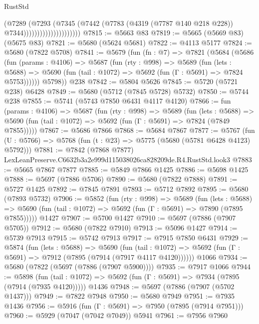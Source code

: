 \begin{lexlean}{RustStd}
\begin{coremodule}
                                    (@7289
                                      (@7293
                                        (@7345
                                          (@7442
                                            (@7783
                                              (@4319 (@7787 @140 @218 @228))
                                              @7344)))))))))))))))))))))
@7815 := @5663 @83
@7819 := @5665 (@5669 @83) (@5675 @83)
@7821 := @5680 (@5624 @5681)
@7822 := @4113 @5177
@7824 := @5680 (@7822 @5708)
@7841 := @5679
    (fun (fn : @7) =>
    @7821
      (@5684
        (@5686
          (fun (params : @4106) =>
          @5687
            (fun (rty : @998) =>
            @5689
              (fun (lets : @5688) =>
              @5690 (fun (tail : @1072) => @5692 (fun (Γ : @5691) => @7824 @5753))))))
        @5798))
    @238
@7842 := @5804 @5626
@7845 := @5720 (@5721 @238) @6428
@7849 := @5680 (@5712 (@7845 @5728) @5732)
@7850 := @5744 @238
@7855 := @5741 (@5743 @7850 @6431 @4117 @4120)
@7866 := fun (params : @4106) =>
  @5687
    (fun (rty : @998) =>
    @5689
      (fun (lets : @5688) =>
      @5690 (fun (tail : @1072) => @5692 (fun (Γ : @5691) => @7824 (@7849 @7855)))))
@7867 := @5686 @7866
@7868 := @5684 @7867
@7877 := @5767 (fun (U : @5766) => @5768 (fun (t : @23) => @5775 (@5680 (@5781 @6428 @4123) @5792)))
@7881 := @7842 (@7868 @7877) LexLeanPreserve.C6632b3a2e999d115038026ca828209de.R4.RustStd.look3
@7883 := @5665 @7867 @7877
@7885 := @5849 @7866 @1425
@7886 := @5698 @1425
@7888 := @5697 (@7886 @5706)
@7890 := @5680 (@7822 @7888)
@7891 := @5727 @1425
@7892 := @7845 @7891
@7893 := @5712 @7892
@7895 := @5680 (@7893 @5732)
@7906 := @5852
    (fun (rty : @998) =>
    @5689
      (fun (lets : @5688) =>
      @5690 (fun (tail : @1072) => @5692 (fun (Γ : @5691) => @7890 (@7895 @7855)))))
    @1427
@7907 := @5700 @1427
@7910 := @5697 (@7886 (@7907 @5705))
@7912 := @5680 (@7822 @7910)
@7913 := @5096 @1427
@7914 := @5739 @7913
@7915 := @5742 @7913
@7917 := @7915 @7850 @6431
@7929 := @5874
    (fun (lets : @5688) =>
    @5690
      (fun (tail : @1072) => @5692 (fun (Γ : @5691) => @7912 (@7895 (@7914 (@7917 @4117 @4120))))))
    @1066
@7934 := @5680 (@7822 (@5697 (@7886 (@7907 @5900))))
@7935 := @7917 @1066
@7944 := @5898
    (fun (tail : @1072) => @5692 (fun (Γ : @5691) => @7934 (@7895 (@7914 (@7935 @4120)))))
    @1436
@7948 := @5697 (@7886 (@7907 (@5702 @1437)))
@7949 := @7822 @7948
@7950 := @5680 @7949
@7951 := @7935 @1436
@7956 := @5916 (fun (Γ : @5691) => @7950 (@7895 (@7914 @7951)))
@7960 := @5929 (@7047 (@7042 @7049)) @5941
@7961 := @7956 @7960

\end{coremodule}
\end{lexlean}
